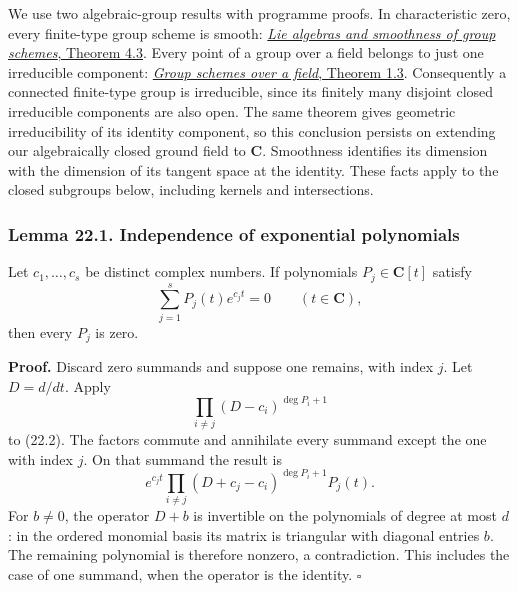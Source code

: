 \documentclass[
  11pt,
  a4paper,
]{article}
\begin{document}
We use two algebraic-group results with programme proofs. In
characteristic zero, every finite-type group scheme is smooth:
\href{https://kokunoyumeto.github.io/open-math-courses-public/courses/AG-GS/AG-GS-02.html\#4-why-characteristic-zero-forces-smoothness}{\emph{Lie
algebras and smoothness of group schemes}, Theorem 4.3}. Every point of
a group over a field belongs to just one irreducible component:
\href{https://kokunoyumeto.github.io/open-math-courses-public/courses/AG-GS/AG-GS-03.html\#1-open-multiplication-and-a-single-component-through-each-point}{\emph{Group
schemes over a field}, Theorem 1.3}. Consequently a connected
finite-type group is irreducible, since its finitely many disjoint
closed irreducible components are also open. The same theorem gives
geometric irreducibility of its identity component, so this conclusion
persists on extending our algebraically closed ground field to
\(\mathbf C\). Smoothness identifies its dimension with the dimension of
its tangent space at the identity. These facts apply to the closed
subgroups below, including kernels and intersections.

\subsubsection{Lemma 22.1. Independence of exponential
polynomials}\label{lemma-22.1.-independence-of-exponential-polynomials}

Let \(c_1,\ldots,c_s\) be distinct complex numbers. If polynomials
\(P_j\in\mathbf C[t]\) satisfy \[
 \sum_{j=1}^s P_j(t)e^{c_jt}=0\qquad(t\in\mathbf C),
 \tag{22.2}
\] then every \(P_j\) is zero.

\textbf{Proof.} Discard zero summands and suppose one remains, with
index \(j\). Let \(D=d/dt\). Apply \[
 \prod_{i\ne j}(D-c_i)^{\deg P_i+1}
\] to (22.2). The factors commute and annihilate every summand except
the one with index \(j\). On that summand the result is \[
 e^{c_jt}\prod_{i\ne j}(D+c_j-c_i)^{\deg P_i+1}P_j(t).
\] For \(b\ne0\), the operator \(D+b\) is invertible on the polynomials
of degree at most \(d\): in the ordered monomial basis its matrix is
triangular with diagonal entries \(b\). The remaining polynomial is
therefore nonzero, a contradiction. This includes the case of one
summand, when the operator is the identity. \(\square\)
\end{document}
